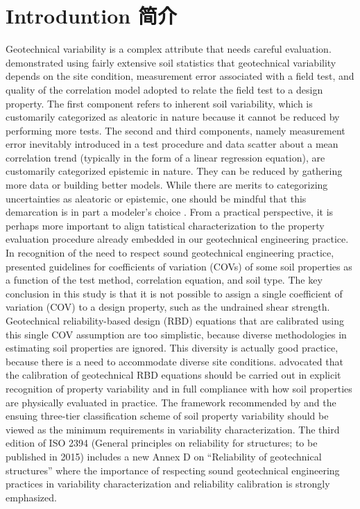 \section*{Introduntion 简介}

\begin{Parallel}{0.60\textwidth}{}
    \ParallelLText
    {
        Geotechnical variability is a complex attribute that needs careful evaluation. \citet{Phoon1999612} demonstrated using fairly extensive soil statistics that geotechnical variability depends on the site condition, measurement error associated with a field test, and quality of the correlation model adopted to relate the field test to a design property. The first component refers to inherent soil variability, which is customarily categorized as aleatoric in nature because it cannot be reduced by performing more tests. The second and third components, namely measurement error inevitably introduced in a test procedure and data scatter about a mean correlation trend (typically in the form of a linear regression equation), are customarily categorized epistemic in nature. They can be reduced by gathering more data or building better models. While there are merits to categorizing uncertainties as aleatoric or epistemic, one should be mindful that this demarcation is in part a modeler’s choice \citep{DerKiureghian2007}. From a practical perspective, it is perhaps more important to align tatistical characterization to the property evaluation procedure already embedded in our geotechnical engineering practice. In recognition of the need to respect sound geotechnical engineering practice, \citet{Phoon1999625} presented guidelines for coefficients of variation (COVs) of some soil properties as a function of the test method, correlation equation, and soil type. The key conclusion in this study is that it is not possible to assign a single coefficient of variation (COV) to a design property, such as the undrained shear strength. Geotechnical reliability-based design (RBD) equations that are calibrated using this single COV assumption are too simplistic, because diverse methodologies in estimating soil properties are ignored. This diversity is actually good practice, because there is a need to accommodate diverse site conditions. \citet{Phoon1999612,Phoon1999625} advocated that the calibration of geotechnical RBD equations should be carried out in explicit recognition of property variability and in full compliance with how soil properties are physically evaluated in practice. The framework recommended by \citet{Phoon1999612,Phoon1999625} and the ensuing three-tier classification scheme of soil property variability \citep{Phoon2008344} should be viewed as the minimum requirements in variability characterization. The third edition of ISO 2394 (General principles on reliability for structures; to be published in 2015) includes a new Annex D on “Reliability of geotechnical structures” where the importance of respecting sound geotechnical engineering practices in variability characterization and reliability calibration is strongly emphasized.
}
\end{Parallel}
